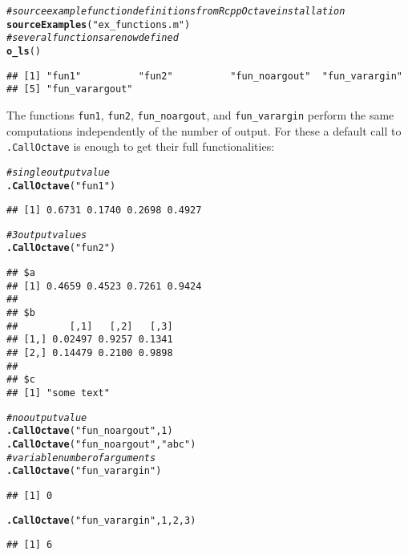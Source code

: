\documentclass[english,10pt,a4paper]{article}\usepackage[]{graphicx}\usepackage[]{color}
\makeatletter
\newcommand{\hlnum}[1]{\textcolor[rgb]{0.686,0.059,0.569}{#1}}%
\newcommand{\hlstr}[1]{\textcolor[rgb]{0.192,0.494,0.8}{#1}}%
\newcommand{\hlcom}[1]{\textcolor[rgb]{0.678,0.584,0.686}{\textit{#1}}}%
\newcommand{\hlstd}[1]{\textcolor[rgb]{0.345,0.345,0.345}{#1}}%
\newcommand{\hlkwd}[1]{\textcolor[rgb]{0.737,0.353,0.396}{\textbf{#1}}}%
\newenvironment{kframe}{%
 \def\at@end@of@kframe{}%
 \ifinner\ifhmode%
  \def\at@end@of@kframe{\end{minipage}}%
  \begin{minipage}{\columnwidth}%
 \fi\fi%
 \def\FrameCommand##1{\hskip\@totalleftmargin \hskip-\fboxsep
 \colorbox{shadecolor}{##1}\hskip-\fboxsep
     \hskip-\linewidth \hskip-\@totalleftmargin \hskip\columnwidth}%
 \MakeFramed {\advance\hsize-\width
   \@totalleftmargin\z@ \linewidth\hsize
   \@setminipage}}%
 {\par\unskip\endMakeFramed%
 \at@end@of@kframe}
\newenvironment{knitrout}{}{} %
\let\code=\texttt
\makeatother
\begin{document}
\begin{knitrout}
\color{fgcolor}\begin{kframe}
\begin{alltt}
\hlcom{# source example function definitions from RcppOctave installation}
\hlkwd{sourceExamples}\hlstd{(}\hlstr{"ex_functions.m"}\hlstd{)}
\hlcom{# several functions are now defined}
\hlkwd{o_ls}\hlstd{()}
\end{alltt}
\begin{verbatim}
## [1] "fun1"          "fun2"          "fun_noargout"  "fun_varargin" 
## [5] "fun_varargout"
\end{verbatim}
\end{kframe}
\end{knitrout}


The functions \code{fun1}, \code{fun2}, \code{fun\_noargout}, and
\code{fun\_varargin} perform the same computations independently of the number
of output.
For these a default call to \code{.CallOctave} is enough to get their full
functionalities:

\begin{knitrout}
\color{fgcolor}\begin{kframe}
\begin{alltt}
\hlcom{# single output value}
\hlkwd{.CallOctave}\hlstd{(}\hlstr{"fun1"}\hlstd{)}
\end{alltt}
\begin{verbatim}
## [1] 0.6731 0.1740 0.2698 0.4927
\end{verbatim}
\begin{alltt}
\hlcom{# 3 output values}
\hlkwd{.CallOctave}\hlstd{(}\hlstr{"fun2"}\hlstd{)}
\end{alltt}
\begin{verbatim}
## $a
## [1] 0.4659 0.4523 0.7261 0.9424
## 
## $b
##         [,1]   [,2]   [,3]
## [1,] 0.02497 0.9257 0.1341
## [2,] 0.14479 0.2100 0.9898
## 
## $c
## [1] "some text"
\end{verbatim}
\begin{alltt}
\hlcom{# no output value}
\hlkwd{.CallOctave}\hlstd{(}\hlstr{"fun_noargout"}\hlstd{,} \hlnum{1}\hlstd{)}
\hlkwd{.CallOctave}\hlstd{(}\hlstr{"fun_noargout"}\hlstd{,} \hlstr{"abc"}\hlstd{)}
\hlcom{# variable number of arguments}
\hlkwd{.CallOctave}\hlstd{(}\hlstr{"fun_varargin"}\hlstd{)}
\end{alltt}
\begin{verbatim}
## [1] 0
\end{verbatim}
\begin{alltt}
\hlkwd{.CallOctave}\hlstd{(}\hlstr{"fun_varargin"}\hlstd{,} \hlnum{1}\hlstd{,} \hlnum{2}\hlstd{,} \hlnum{3}\hlstd{)}
\end{alltt}
\begin{verbatim}
## [1] 6
\end{verbatim}
\end{kframe}
\end{knitrout}
\end{document}
